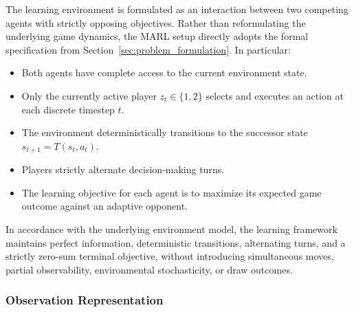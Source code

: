 \documentclass{article}
\begin{document}
The learning environment is formulated as an interaction between two competing agents with strictly opposing objectives. Rather than reformulating the underlying game dynamics, the MARL setup directly adopts the formal specification from Section~\ref{sec:problem_formulation}. In particular:
\begin{itemize}
    \item Both agents have complete access to the current environment state.
    \item Only the currently active player $z_t \in \{1, 2\}$ selects and executes an action at each discrete timestep $t$.
    \item The environment deterministically transitions to the successor state $s_{t+1} = T(s_t, a_t)$.
    \item Players strictly alternate decision-making turns.
    \item The learning objective for each agent is to maximize its expected game outcome against an adaptive opponent.
\end{itemize}
In accordance with the underlying environment model, the learning framework maintains perfect information, deterministic transitions, alternating turns, and a strictly zero-sum terminal objective, without introducing simultaneous moves, partial observability, environmental stochasticity, or draw outcomes.

\subsubsection{Observation Representation}
\label{subsubsec:obs_representation}
\end{document}
